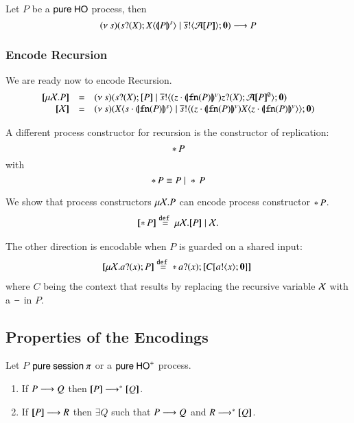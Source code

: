 \begin{proposition}
	Let $P$ be a $\mathsf{pure\ HO}$ process, then
	\[
		\newsp{s}{\binp{s}{X} \appl{\X}{\smap{P}} \Par \bout{\dual{s}}{\amap{P}}\inact} \red P
	\]
\end{proposition}


\subsubsection{Encode Recursion}
We are ready now to encode Recursion.
%
\[
\begin{array}{rcl}
	\map{\rec{X}{P}} &=& \newsp{s}{\binp{s}{\X} \map{P} \Par \bout{\dual{s}}{\abs{z \cat \vmap{\fn{P}}}{\binp{z}{\X} \absmap{P}{\es}}} \inact}\\
	\map{\rvar{X}} &=& \newsp{s}{\appl{\X}{s \cat \smap{\fn{P}}} \Par \bout{\dual{s}}{ \abs{z \cat \vmap{\fn{P}}}{\appl{X}{z \cat \vmap{\fn{P}}}}} \inact}
\end{array}
\]
%

A different process constructor for recursion is the constructor of replication:
\[
	\ast\,{} P
\]
with
\[
	\ast\,{} P \equiv P \;|\; \ast\,{} P
\]

We show that process constructors $\mu \mathcal{X}. P$ can encode process constructor $\ast\,{} P$.
\[
\begin{array}{rcl}
	\map{\repl{} P} \defeq \recp{X}{\map{P} \Par \rvar{X}}.
\end{array}
\]

The other direction is encodable when $P$ is guarded on a shared input:
\[
\begin{array}{rcl}
	\map{\recp{X} \binp{a}{x} P} \defeq \repl{} \binp{a}{x} \map{\context{C}{\bout{a}{x} \inact}}\
\end{array}
\]
where $C$ being the context that results by replacing the recursive variable $\mathcal{X}$
with a $-$ in $P$.

\subsection{Properties of the Encodings}

\begin{proposition}
	Let $P$ $\mathsf{pure\ session\ }\pi$ or a $\mathsf{pure\ HO}^+$ process.
	\begin{enumerate}
		\item	If $P \longrightarrow Q$ then $\map{P} \red^* \map{Q}$.
		\item	If $[\!\![P]\!\!] \longrightarrow R$ then $\exists Q$ such that $P \longrightarrow Q$ and $R \longrightarrow^* [\!\![Q]\!\!]$.
	\end{enumerate}
\end{proposition}

